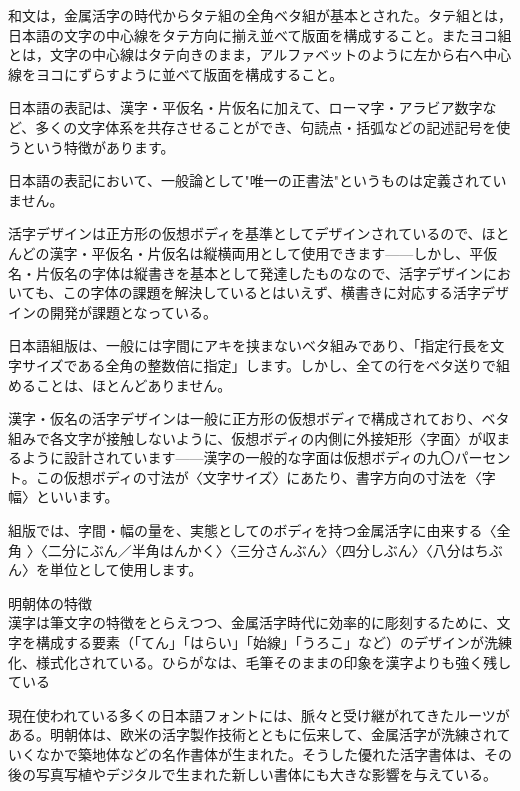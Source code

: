 和文は，金属活字の時代からタテ組の全角ベタ組が基本とされた。タテ組とは，日本語の文字の中心線をタテ方向に揃え並べて版面を構成すること。またヨコ組とは，文字の中心線はタテ向きのまま，アルファベットのように左から右へ中心線をヨコにずらすように並べて版面を構成すること\cite{handbook_of_typography}。

日本語の表記は、漢字・平仮名・片仮名に加えて、ローマ字・アラビア数字など、多くの文字体系を共存させることができ、句読点・括弧などの記述記号を使うという特徴があります\cite{introduction_to_japanese_typesetting}。

日本語の表記において、一般論として"唯一の正書法"というものは定義されていません\cite{introduction_to_japanese_typesetting}。

活字デザインは正方形の仮想ボディを基準としてデザインされているので、ほとんどの漢字・平仮名・片仮名は縦横両用として使用できます——しかし、平仮名・片仮名の字体は縦書きを基本として発達したものなので、活字デザインにおいても、この字体の課題を解決しているとはいえず、横書きに対応する活字デザインの開発が課題となっている\cite{introduction_to_japanese_typesetting}。

日本語組版は、一般には字間にアキを挟まないベタ組みであり、「指定行長を文字サイズである全角の整数倍に指定」します。しかし、全ての行をベタ送りで組めることは、ほとんどありません\cite{introduction_to_japanese_typesetting}。

漢字・仮名の活字デザインは一般に正方形の仮想ボディで構成されており、ベタ組みで各文字が接触しないように、仮想ボディの内側に外接矩形〈字面〉が収まるように設計されています——漢字の一般的な字面は仮想ボディの九〇パーセント。この仮想ボディの寸法が〈文字サイズ〉にあたり、書字方向の寸法を〈字幅〉といいます\cite{introduction_to_japanese_typesetting}。

組版では、字間・幅の量を、実態としてのボディを持つ金属活字に由来する〈全角 〉〈二分にぶん／半角はんかく〉〈三分さんぶん〉〈四分しぶん〉〈八分はちぶん〉を単位として使用します\cite{introduction_to_japanese_typesetting}。

明朝体の特徴\\
漢字は筆文字の特徴をとらえつつ、金属活字時代に効率的に彫刻するために、文字を構成する要素（「てん」「はらい」「始線」「うろこ」など）のデザインが洗練化、様式化されている。ひらがなは、毛筆そのままの印象を漢字よりも強く残している\cite{mdn_201507}

現在使われている多くの日本語フォントには、脈々と受け継がれてきたルーツがある。明朝体は、欧米の活字製作技術とともに伝来して、金属活字が洗練されていくなかで築地体などの名作書体が生まれた。そうした優れた活字書体は、その後の写真写植やデジタルで生まれた新しい書体にも大きな影響を与えている。

